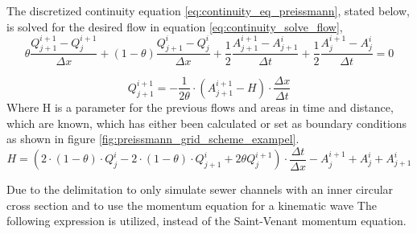 
The discretized continuity equation \ref{eq:continuity_eq_preissmann}, stated below, is solved for the desired flow in equation \ref{eq:continuity_solve_flow},
\begin{equation}
    \theta \frac{Q_{j+1}^{i+1}-Q_j^{i+1}}{\Delta x}+(1-\theta)\frac{Q_{j+1}^i - Q_j^i}{\Delta x}+
    \frac{1}{2}\frac{A_{j+1}^{i+1}-A_{j+1}^i}{\Delta t} + \frac{1}{2} \frac{A_{j}^{i+1} - A_j^i}{\Delta t} = 0
\end{equation}

\begin{equation}\label{eq:continuity_solve_flow}
    Q_{j+1}^{i+1} = - \frac{1}{2\theta}\cdot\left(A_{j+1}^{i+1}-H\right)\cdot\frac{\Delta x}{\Delta t}
\end{equation}
Where H is a parameter for the previous flows and areas in time and distance, which are known, which has either been calculated or set as boundary conditions as shown in figure \ref{fig:preissmann_grid_scheme_exampel}. 
\begin{equation}
    H = \left(2\cdot(1-\theta)\cdot Q_j^i-2\cdot(1-\theta)\cdot Q_{j+1}^i+2\theta Q_j^{i+1}\right)\cdot\frac{\Delta t}{\Delta x}- A_{j}^{i+1}+A_j^i+A_{j+1}^i
\end{equation}

Due to the delimitation to only simulate sewer channels with an inner circular cross section and to use the momentum equation for a kinematic wave
The following expression is utilized, instead of the Saint-Venant momentum equation. %

